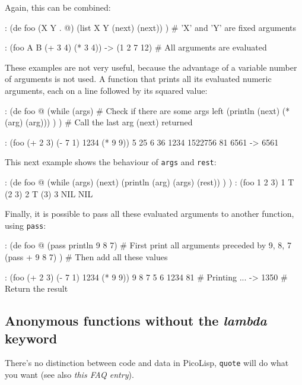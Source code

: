 Again, this can be combined:


\begin{wideverbatim}
: (de foo (X Y . @)
   (list X Y (next) (next)) ) # 'X' and 'Y' are fixed arguments

: (foo A B (+ 3 4) (* 3 4))
-> (1 2 7 12)                 # All arguments are evaluated
\end{wideverbatim}

These examples are not very useful, because the advantage of a variable
number of arguments is not used. A function that prints all its
evaluated numeric arguments, each on a line followed by its squared
value:


\begin{wideverbatim}
: (de foo @
   (while (args)                            # Check if there are some args left
      (println (next) (* (arg) (arg))) ) )  # Call the last arg (next) returned

: (foo (+ 2 3) (- 7 1) 1234 (* 9 9))
5 25
6 36
1234 1522756
81 6561
-> 6561
\end{wideverbatim}

This next example shows the behaviour of \texttt{args} and \texttt{rest}:


\begin{wideverbatim}
: (de foo @
   (while (args)
      (next)
      (println (arg) (args) (rest)) ) )
: (foo 1 2 3)
1 T (2 3)
2 T (3)
3 NIL NIL
\end{wideverbatim}

Finally, it is possible to pass all these evaluated arguments to another
function, using \texttt{pass}:


\begin{wideverbatim}
: (de foo @
   (pass println 9 8 7)       # First print all arguments preceded by 9, 8, 7
   (pass + 9 8 7) )           # Then add all these values

: (foo (+ 2 3) (- 7 1) 1234 (* 9 9))
9 8 7 5 6 1234 81             # Printing ...
-> 1350                       # Return the result
\end{wideverbatim}

 
\subsection{Anonymous functions without the \emph{lambda} keyword}
\label{sec:tut-anonymous-functions-without-the-lambda}


There's no distinction between code and data in PicoLisp, \texttt{quote} will
do what you want (see also \emph{this FAQ entry}).


